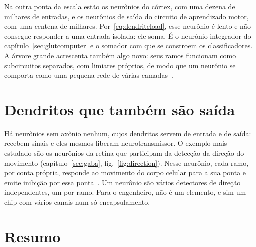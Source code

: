 Na outra ponta da escala estão os neurônios  do córtex, com uma dezena de milhares de entradas, e os neurônios  de saída do circuito de aprendizado motor, com uma centena de milhares. Por~\eqref{eq:dendriteload}, esse neurônio é lento e não consegue responder a uma entrada isolada: ele soma. É o neurônio integrador do capítulo~\ref{sec:glutcomputer} e o somador com que se constroem os classificadores. A árvore grande acrescenta também algo novo: seus ramos funcionam como subcircuitos separados, com limiares próprios, de modo que um neurônio se comporta como uma pequena rede de várias camadas~\cite{Beniaguev2021,Gidon2020}.

\section{Dendritos que também são saída}

Há neurônios sem axônio nenhum, cujos dendritos servem de entrada e de saída: recebem sinais e eles mesmos liberam neurotransmissor. O exemplo mais estudado são os neurônios  da retina que participam da detecção da direção do movimento (capítulo~\ref{sec:gaba}, fig.~\ref{fig:direction}). Nesse neurônio, cada ramo, por conta própria, responde ao movimento do corpo celular para a sua ponta e emite inibição por essa ponta~\cite{Euler2002}. Um neurônio são vários detectores de direção independentes, um por ramo. Para o engenheiro, não é um elemento, e sim um chip com vários canais num só encapsulamento.

\section{Resumo}

